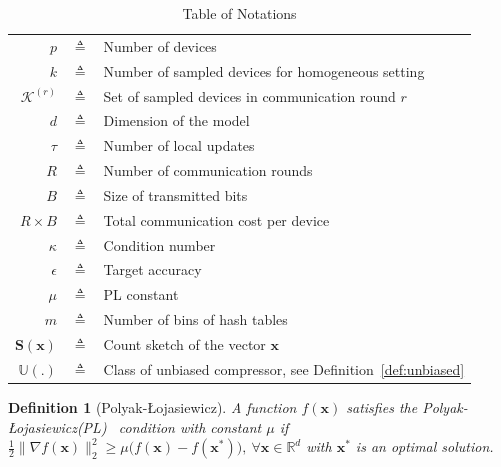 \documentclass[sigconf, anonymous, review]{acmart}
\newcommand{\pl}{Polyak-\L{}ojasiewicz}
\newtheorem{definition}{Definition}
\begin{document}
\begin{table}[htbp]\caption{Table of Notations}
\begin{center}%
\begin{tabular}{r c p{10cm} }
\toprule
$p$ & $\triangleq$ & Number of devices\\
$k$ & $\triangleq$ & Number of sampled devices for homogeneous setting\\
$\mathcal{K}^{(r)}$ & $\triangleq$ & Set of sampled devices in communication round $r$\\
$d$ & $\triangleq$ &  Dimension of the model \\
$\tau$ & $\triangleq$ & Number of local updates\\
$R$ & $\triangleq$ & Number of communication rounds\\
$B$ & $\triangleq$ &  Size of transmitted bits \\
$R\times B$ & $\triangleq$ &  Total communication cost per device \\
$\kappa$ & $\triangleq$ & Condition number\\
$\epsilon$ & $\triangleq$ & Target accuracy\\
$\mu$ & $\triangleq$ & PL constant \\
$m$ & $\triangleq$ &  Number of bins of hash tables \\
 $\mathbf{S}(\boldsymbol{x})$  & $\triangleq$ &  Count sketch of the vector $\boldsymbol{x}$\\
 $\mathbb{U}(.)$  & $\triangleq$ &  Class of unbiased compressor, see Definition~\ref{def:unbiased}\\
\bottomrule
\end{tabular}
\end{center}
\label{tab:notations}
\end{table}

\begin{definition}[\pl]\label{assum:pl}
A function $f(\boldsymbol{x})$ satisfies the \pl (PL)~ condition with constant $\mu$ if $\frac{1}{2}\|\nabla f(\boldsymbol{x})\|_2^2\geq \mu\big(f(\boldsymbol{x})-f(\boldsymbol{x}^*)\big),\: \forall \boldsymbol{x}\in\mathbb{R}^d $ with $\boldsymbol{x}^*$ is an optimal solution.
\end{definition}
\end{document}
